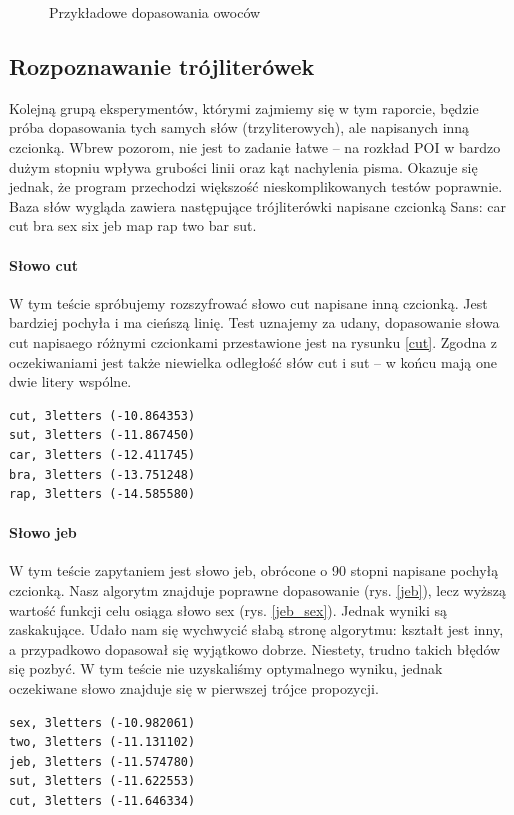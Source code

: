 \documentclass[a4paper,12pt,leqno]{article}
\begin{document}
\begin{figure}
\caption{Przykładowe dopasowania owoców}\label{matches}
\end{figure}

\subsection{Rozpoznawanie trójliterówek}

Kolejną grupą eksperymentów, którymi zajmiemy się w tym raporcie, będzie próba dopasowania tych samych słów (trzyliterowych), ale napisanych inną czcionką.
Wbrew pozorom, nie jest to zadanie łatwe -- na rozkład POI w bardzo dużym stopniu wpływa grubości linii oraz kąt nachylenia pisma. Okazuje się jednak, że
program przechodzi większość nieskomplikowanych testów poprawnie. Baza słów wygląda zawiera następujące trójliterówki napisane czcionką Sans:
car cut bra sex six jeb map rap two bar sut.

\paragraph{Słowo cut}
W tym teście spróbujemy rozszyfrować słowo cut napisane inną czcionką. Jest bardziej pochyła i ma cieńszą linię. Test uznajemy za udany, dopasowanie słowa
cut napisaego różnymi czcionkami przestawione jest na rysunku \ref{cut}. Zgodna z oczekiwaniami jest także niewielka odległość słów cut i sut -- w końcu
mają one dwie litery wspólne.
\begin{verbatim}
cut, 3letters (-10.864353)
sut, 3letters (-11.867450)
car, 3letters (-12.411745)
bra, 3letters (-13.751248)
rap, 3letters (-14.585580)
\end{verbatim}

\paragraph{Słowo jeb}
W tym teście zapytaniem jest słowo jeb, obrócone o 90 stopni napisane pochyłą czcionką. Nasz algorytm znajduje poprawne dopasowanie (rys. \ref{jeb}), 
lecz wyższą wartość funkcji celu osiąga słowo sex (rys. \ref{jeb_sex}). Jednak wyniki są zaskakujące. Udało nam się wychwycić słabą stronę algorytmu:
kształt jest inny, a przypadkowo dopasował się wyjątkowo dobrze. Niestety, trudno takich błędów się pozbyć. W tym teście nie uzyskaliśmy optymalnego
wyniku, jednak oczekiwane słowo znajduje się w pierwszej trójce propozycji.
\begin{verbatim}
sex, 3letters (-10.982061)
two, 3letters (-11.131102)
jeb, 3letters (-11.574780)
sut, 3letters (-11.622553)
cut, 3letters (-11.646334)
\end{verbatim}
\end{document}
